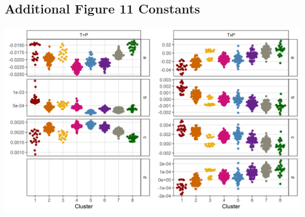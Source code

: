 \documentclass[
]{article}
\begin{document}
\hypertarget{additional-figure-11-constants}{%
\subsection{Additional Figure 11
Constants}\label{additional-figure-11-constants}}

\includegraphics{Additional/Additional_Figure_11.png}
\end{document}
